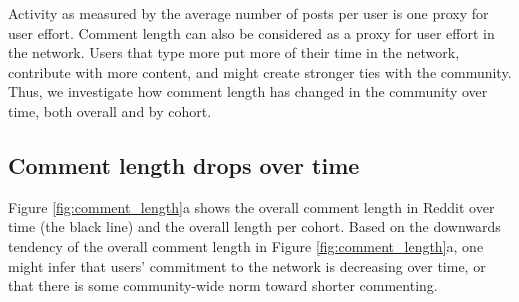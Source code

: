 \begin{figure*}[!tb]
\centering
{}
\caption{Figure (a) shows the average comment length over clock time and Figure (b) from the user-referential time. Both figures show the cohorted trends and the overall users trends.  The overall average length per comment decreases over time, although for any individual cohort, it increases after a sharp initial drop. Figure (c), similar to Figure \ref{fig:avr_posts_per_user_for_surviving_year}, shows the monthly average comment length for active users in the cohorts of 2010, 2011 and 2012, segmented by the number of years that the user survived in the network.  Opposite the analysis for average posts, which showed that low-activity users were the first to leave Reddit, here, people who start out as longer commenters are \textit{more} likely to leave.}
\label{fig:comment_length}
\end{figure*}

Activity as measured by the average number of posts per user is one proxy for user effort.  Comment length can also be considered as a proxy for user effort in the network.  Users that type more put more of their time in the network, contribute with more content, and might create stronger ties with the community.  Thus, we investigate how comment length has changed in the community over time, both overall and by cohort. 

\subsection{Comment length drops over time}

Figure \ref{fig:comment_length}a shows the overall comment length in Reddit over time (the black line) and the overall length per cohort. 
Based on the downwards tendency of the overall comment length in Figure \ref{fig:comment_length}a, one might infer that users' commitment to the network is decreasing over time, or that there is some community-wide norm toward shorter commenting. 

